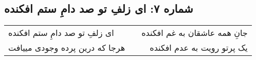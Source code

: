 \begin{center}
\section*{شماره ۷: ای زلفِ تو صد دامِ ستم افکنده}
\label{sec:007}
\begin{longtable}{l p{0.5cm} r}
ای زلفِ تو صد دامِ ستم افکنده
&&
جانِ همه عاشقان به غم افکنده
\\
هرجا که درین پرده وجودی مییافت
&&
یک پرتو رویت به عدم افکنده
\\
\end{longtable}
\end{center}
